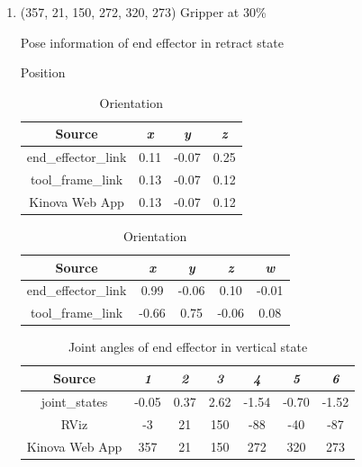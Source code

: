 \documentclass[12pt]{article}
\begin{document}
\begin{enumerate}
\begin{enumerate}
        \item (357, 21, 150, 272, 320, 273) Gripper at 30\%
        
        \begin{table}[H]
            \caption{Pose information of end effector in retract state}
            \begin{subtable}{.4\linewidth}
                \centering
                \caption{Position}
                \begin{tabular}{cccc}
                    \toprule
                    Source & \textit{x} & \textit{y} & \textit{z} \\\midrule
                    end\_effector\_link & 0.11 & -0.07 & 0.25 \\
                    tool\_frame\_link & 0.13 & -0.07 & 0.12 \\
                    Kinova Web App & 0.13 & -0.07 & 0.12 \\\bottomrule
                \end{tabular}
            \end{subtable}
            \hfill
            \begin{subtable}{.52\linewidth}
                \centering
                \caption{Orientation}
                \begin{tabular}{ccccc}
                    \toprule
                    Source & \textit{x} & \textit{y} & \textit{z} & \textit{w} \\\midrule
                    end\_effector\_link & 0.99 & -0.06 & 0.10 & -0.01 \\
                    tool\_frame\_link & -0.66 & 0.75 & -0.06 & 0.08 \\\bottomrule
                \end{tabular}
            \end{subtable}
        \end{table}
        \vspace{-10pt}
        \begin{table}[H]
            \centering
            \caption{Joint angles of end effector in vertical state}
            \begin{tabular}{ccccccc}
            \toprule
            Source & \textit{1} & \textit{2} & \textit{3} & \textit{4} & \textit{5} & \textit{6} \\\midrule
            joint\_states & -0.05 & 0.37 & 2.62 & -1.54 & -0.70 & -1.52 \\
            RViz & -3 & 21 & 150 & -88 & -40 & -87 \\
            Kinova Web App & 357 & 21 & 150 & 272 & 320 & 273 \\\bottomrule
            \end{tabular}
        \end{table}


\end{enumerate}
\end{enumerate}
\end{document}
